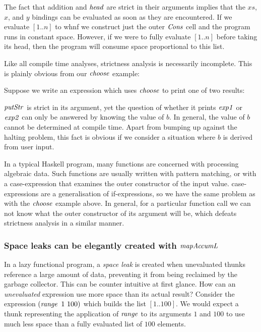 
The fact that addition and $\operatorname{\mathit{head}}$ are strict in their arguments implies that the $xs$, $x$, and $y$ bindings can be evaluated as soon as they are encountered. If we evaluate $[1..n]$ to whnf we construct just the outer $\operatorname{\mathit{Cons}}$ cell and the program runs in constant space. However, if we were to fully evaluate $[1..n]$ before taking its head, then the program will consume space proportional to this list.

Like all compile time analyses, strictness analysis is necessarily incomplete. This is plainly obvious from our $\operatorname{\mathit{choose}}$ example:


Suppose we write an expression which uses $\operatorname{\mathit{choose}}$ to print one of two results:


$\operatorname{\mathit{putStr}}$ is strict in its argument, yet the question of whether it prints $\operatorname{\mathit{exp1}}$ or $\operatorname{\mathit{exp2}}$ can only be answered by knowing the value of $b$. In general, the value of $b$ cannot be determined at compile time. Apart from bumping up against the halting problem, this fact is obvious if we consider a situation where $b$ is derived from user input.

In a typical Haskell program, many functions are concerned with processing algebraic data. Such functions are usually written with pattern matching, or with a case-expression that examines the outer constructor of the input value. case-expressions are a generalisation of if-expressions, so we have the same problem as with the $\operatorname{\mathit{choose}}$ example above. In general, for a particular function call we can not know what the outer constructor of its argument will be, which defeats strictness analysis in a similar manner.


\subsubsection{Space leaks can be elegantly created with $\operatorname{\mathit{mapAccumL}}$}

In a lazy functional program, a \emph{space leak} is created when unevaluated thunks reference a large amount of data, preventing it from being reclaimed by the garbage collector. This can be counter intuitive at first glance. How can an \emph{unevaluated} expression use more space than its actual result? Consider the expression $(\operatorname{\mathit{range}} \ 1 \ 100)$ which builds the list $[1..100]$. We would expect a thunk representing the application of $\operatorname{\mathit{range}}$ to its arguments $1$ and $100$ to use much less space than a fully evaluated list of $100$ elements.

